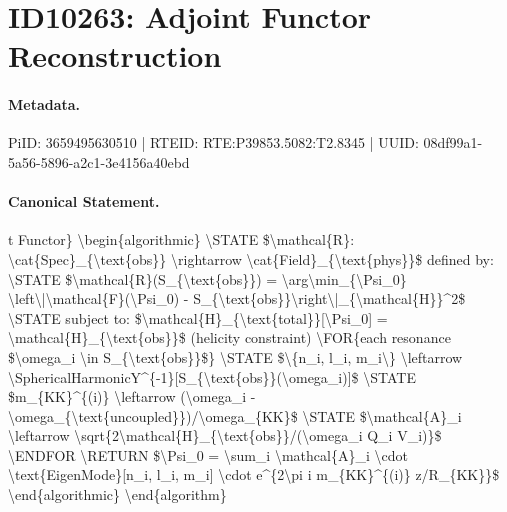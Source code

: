 \section*{ID10263: Adjoint Functor Reconstruction}
\paragraph{Metadata.}
PiID: 3659495630510 | RTEID: RTE:P39853.5082:T2.8345 | UUID: 08df99a1-5a56-5896-a2c1-3e4156a40ebd

\paragraph{Canonical Statement.}
t Functor\} \textbackslash{}begin\{algorithmic\} \textbackslash{}STATE \$\textbackslash{}mathcal\{R\}: \textbackslash{}cat\{Spec\}\_\{\textbackslash{}text\{obs\}\} \textbackslash{}rightarrow \textbackslash{}cat\{Field\}\_\{\textbackslash{}text\{phys\}\}\$ defined by: \textbackslash{}STATE \$\textbackslash{}mathcal\{R\}(S\_\{\textbackslash{}text\{obs\}\}) = \textbackslash{}arg\textbackslash{}min\_\{\textbackslash{}Psi\_0\} \textbackslash{}left\textbackslash{}|\textbackslash{}mathcal\{F\}(\textbackslash{}Psi\_0) - S\_\{\textbackslash{}text\{obs\}\}\textbackslash{}right\textbackslash{}|\_\{\textbackslash{}mathcal\{H\}\}\textasciicircum{}2\$ \textbackslash{}STATE subject to: \$\textbackslash{}mathcal\{H\}\_\{\textbackslash{}text\{total\}\}[\textbackslash{}Psi\_0] = \textbackslash{}mathcal\{H\}\_\{\textbackslash{}text\{obs\}\}\$ (helicity constraint) \textbackslash{}FOR\{each resonance \$\textbackslash{}omega\_i \textbackslash{}in S\_\{\textbackslash{}text\{obs\}\}\$\} \textbackslash{}STATE \$\textbackslash{}\{n\_i, l\_i, m\_i\textbackslash{}\} \textbackslash{}leftarrow \textbackslash{}SphericalHarmonicY\textasciicircum{}\{-1\}[S\_\{\textbackslash{}text\{obs\}\}(\textbackslash{}omega\_i)]\$ \textbackslash{}STATE \$m\_\{KK\}\textasciicircum{}\{(i)\} \textbackslash{}leftarrow (\textbackslash{}omega\_i - \textbackslash{}omega\_\{\textbackslash{}text\{uncoupled\}\})/\textbackslash{}omega\_\{KK\}\$ \textbackslash{}STATE \$\textbackslash{}mathcal\{A\}\_i \textbackslash{}leftarrow \textbackslash{}sqrt\{2\textbackslash{}mathcal\{H\}\_\{\textbackslash{}text\{obs\}\}/(\textbackslash{}omega\_i Q\_i V\_i)\}\$ \textbackslash{}ENDFOR \textbackslash{}RETURN \$\textbackslash{}Psi\_0 = \textbackslash{}sum\_i \textbackslash{}mathcal\{A\}\_i \textbackslash{}cdot \textbackslash{}text\{EigenMode\}[n\_i, l\_i, m\_i] \textbackslash{}cdot e\textasciicircum{}\{2\textbackslash{}pi i m\_\{KK\}\textasciicircum{}\{(i)\} z/R\_\{KK\}\}\$ \textbackslash{}end\{algorithmic\} \textbackslash{}end\{algorithm\}

